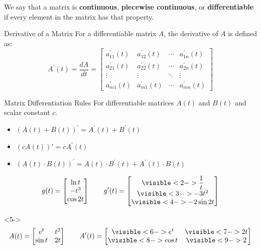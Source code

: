 \documentclass{beamer}
\begin{document}
\begin{frame}
\begin{block}{}
We say that a matrix is \textbf{continuous}, \textbf{piecewise continuous}, or \textbf{differentiable} if every element in the matrix has that property.
\end{block}\pause
\begin{block}{Derivative of a Matrix}
For a differentiable matrix $A$, the derivative of $A$ is defined as:
\begin{equation*}
A^\prime(t)=\dfrac{dA}{dt}=
\begin{bmatrix}
a_{11}^\prime(t)&a_{12}^\prime(t)&\cdots&a_{1n}^\prime(t)\\
a_{21}^\prime(t)&a_{22}^\prime(t)&\cdots&a_{2n}^\prime(t)\\
\vdots&\vdots&\ddots&\vdots\\
a_{m1}^\prime(t)&a_{m1}^\prime(t)&\cdots&a_{mn}^\prime(t)
\end{bmatrix}
\end{equation*}
\end{block}\pause
\begin{block}{Matrix Differentiation Rules}
For differentiable matrices $A(t)$ and $B(t)$ and scalar constant $c$.
\begin{itemize}
\item ${\left(A(t)+B(t)\right)}^\prime=A^\prime(t)+B^\prime(t)$
\item $\left(cA(t)\right)\prime=cA^\prime(t)$
\item ${\left(A(t)\cdot B(t)\right)}^\prime=A(t)\cdot B^\prime(t)+A^\prime(t)\cdot  B(t)$
\end{itemize}
\end{block}
\end{frame}

\begin{frame}
\begin{example}
\centering
\begin{equation*}
g(t)=
\begin{bmatrix}
\ln t\\
-t^3\\
\cos 2t
\end{bmatrix}
\qquad g^\prime(t)=
\begin{bmatrix}
\visible<2->{\dfrac{1}{t}}\\
\visible<3->{-3t^2}\\
\visible<4->{-2\sin 2t}
\end{bmatrix}
\end{equation*}
\end{example}
\pause
\begin{example}<5->
\centering
\begin{equation*}
A(t)=
\begin{bmatrix}
e^t & t^2\\
\sin t & 2t
\end{bmatrix}
\qquad A^\prime(t)=
\begin{bmatrix}
\visible<6->{e^t} & \visible<7->{2t}\\
\visible<8->{\cos t} & \visible<9->{2}
\end{bmatrix}
\end{equation*}
\end{example}
\end{frame}
\end{document}
